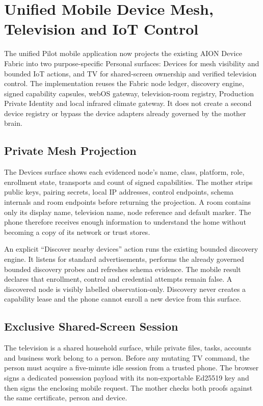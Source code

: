 \begingroup
\sloppy
\section{Unified Mobile Device Mesh, Television and IoT Control}
\label{sec:pilot-unified-mobile-device-mesh}

The unified Pilot mobile application now projects the existing AION Device Fabric into two
purpose-specific Personal surfaces: Devices for mesh visibility and bounded IoT actions, and TV
for shared-screen ownership and verified television control.  The implementation reuses the
Fabric node ledger, discovery engine, signed capability capsules, webOS gateway, television-room
registry, Production Private Identity and local infrared climate gateway.  It does not create a
second device registry or bypass the device adapters already governed by the mother brain.

\subsection{Private Mesh Projection}

The Devices surface shows each evidenced node's name, class, platform, role, enrollment state,
transports and count of signed capabilities.  The mother strips public keys, pairing secrets,
local IP addresses, control endpoints, schema internals and room endpoints before returning the
projection.  A room contains only its display name, television name, node reference and default
marker.  The phone therefore receives enough information to understand the home without becoming
a copy of its network or trust stores.

An explicit ``Discover nearby devices'' action runs the existing bounded discovery engine.  It
listens for standard advertisements, performs the already governed bounded discovery probes and
refreshes schema evidence.  The mobile result declares that enrollment, control and credential
attempts remain false.  A discovered node is visibly labelled observation-only.  Discovery never
creates a capability lease and the phone cannot enroll a new device from this surface.

\subsection{Exclusive Shared-Screen Session}

The television is a shared household surface, while private files, tasks, accounts and business
work belong to a person.  Before any mutating TV command, the person must acquire a five-minute
idle session from a trusted phone.  The browser signs a dedicated possession payload with its
non-exportable Ed25519 key and then signs the enclosing mobile request.  The mother checks both
proofs against the same certificate, person and device.

